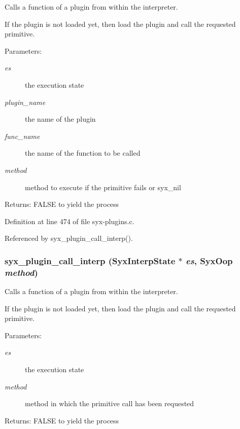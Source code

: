 Calls a function of a plugin from within the interpreter.

If the plugin is not loaded yet, then load the plugin and call the requested primitive.

\begin{Desc}
\item[Parameters:]
\begin{description}
\item[{\em es}]the execution state \item[{\em plugin\_\-name}]the name of the plugin \item[{\em func\_\-name}]the name of the function to be called \item[{\em method}]method to execute if the primitive fails or syx\_\-nil \end{description}
\end{Desc}
\begin{Desc}
\item[Returns:]FALSE to yield the process \end{Desc}


Definition at line 474 of file syx-plugins.c.

Referenced by syx\_\-plugin\_\-call\_\-interp().\hypertarget{syx-plugins_8c_5f38432e4548b44f86339de097cc50c6}{
\subsubsection{ syx\_\-plugin\_\-call\_\-interp ({\bf SyxInterpState} $\ast$ {\em es}, \/  {\bf SyxOop} {\em method})}}
\label{syx-plugins_8c_5f38432e4548b44f86339de097cc50c6}


Calls a function of a plugin from within the interpreter.

If the plugin is not loaded yet, then load the plugin and call the requested primitive.

\begin{Desc}
\item[Parameters:]
\begin{description}
\item[{\em es}]the execution state \item[{\em method}]method in which the primitive call has been requested \end{description}
\end{Desc}
\begin{Desc}
\item[Returns:]FALSE to yield the process \end{Desc}


